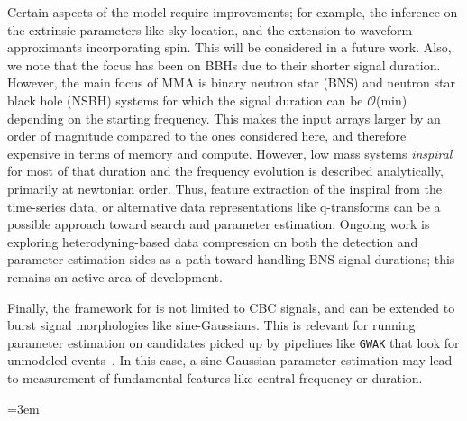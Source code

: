 \begin{refsection}
Certain aspects of the model require improvements; for example, the inference on the extrinsic parameters like sky location, and the extension to waveform approximants incorporating spin. 
This will be considered in a future work.
Also, we note that the focus has been on BBHs due to their shorter signal duration. 
However, the main focus of MMA is binary neutron star (BNS) and neutron star black hole (NSBH) systems for which the signal duration can be $\mathcal{O}$(min) depending on the starting frequency. 
This makes the input arrays larger by an order of magnitude compared to the ones considered here, and therefore expensive in terms of memory and compute.
However, low mass systems \emph{inspiral} for most of that duration and the frequency evolution is described analytically, primarily at newtonian order. 
Thus, feature extraction of the inspiral from the time-series data, or alternative data representations like q-transforms can be a possible approach toward search and parameter estimation.
Ongoing work is exploring heterodyning-based data compression on both the detection and parameter estimation sides as a path toward handling BNS signal durations; this remains an active area of development.

Finally, the framework for {\amplfi} is not limited to CBC signals, and can be extended to burst signal morphologies like sine-Gaussians. 
This is relevant for running parameter estimation on candidates picked up by pipelines like
{\tt GWAK} that look for unmodeled events~\cite{Raikman:2023ktu}. 
In this case, a sine-Gaussian parameter estimation may lead to measurement of fundamental features like central frequency or duration.


\singlespacing
\begingroup
\emergencystretch=3em
\printbibliography[title=References,heading=subbibintoc]
\endgroup
\end{refsection}